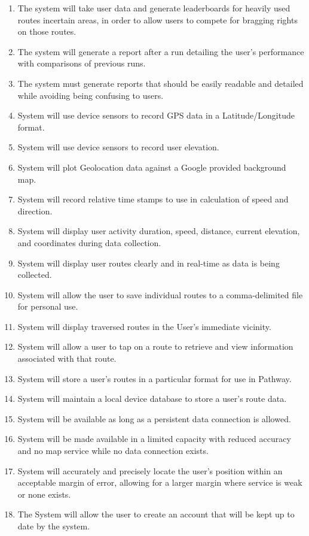 \documentclass{article}
\begin{document}
\begin{enumerate}
    \item The system will take user data and generate leaderboards for heavily used routes incertain areas, in order to allow users to compete for bragging rights on those routes.
    \item The system will generate a report after a run detailing the user’s performance with comparisons of previous runs.
    \item The system must generate reports that should be easily readable and detailed while avoiding being confusing to users.
    \item System will use device sensors to record GPS data in a Latitude/Longitude format.
    \item System will use device sensors to record user elevation.
    \item System will plot Geolocation data against a Google provided background map.
    \item System will record relative time stamps to use in calculation of speed and direction.
    \item System will display user activity duration, speed, distance, current elevation, and coordinates during data collection.
    \item System will display user routes clearly and in real-time as data is being collected.
    \item System will allow the user to save individual routes to a comma-delimited file for personal use.
    \item System will display traversed routes in the User's immediate vicinity.
    \item System will allow a user to tap on a route to retrieve and view information associated with that route.
    \item System will store a user’s routes in a particular format for use in Pathway.
    \item System will maintain a local device database to store a user's route data.
    \item System will be available as long as a persistent data connection is allowed.
    \item System will be made available in a limited capacity with reduced accuracy and no map service while no data connection exists.
    \item System will accurately and precisely locate the user’s position within an acceptable margin of error, allowing for a larger margin where service is weak or none exists.
    \item The System will allow the user to create an account that will be kept up to date by the system.

\end{enumerate}
\end{document}
